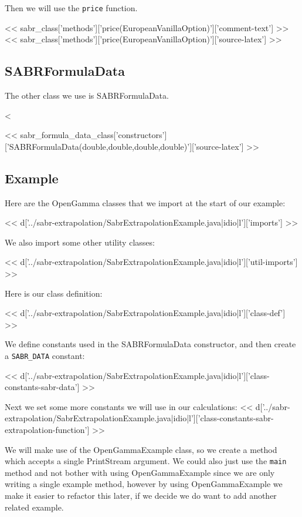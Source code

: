 Then we will use the \verb|price| function.

<< sabr_class['methods']['price(EuropeanVanillaOption)']['comment-text'] >>
<< sabr_class['methods']['price(EuropeanVanillaOption)']['source-latex'] >>

\subsection{SABRFormulaData}

The other class we use is SABRFormulaData.

<%

<< sabr_formula_data_class['constructors']['SABRFormulaData(double,double,double,double)']['source-latex'] >>

\subsection{Example}

Here are the OpenGamma classes that we import at the start of our example:

<< d['../sabr-extrapolation/SabrExtrapolationExample.java|idio|l']['imports'] >>

We also import some other utility classes:

<< d['../sabr-extrapolation/SabrExtrapolationExample.java|idio|l']['util-imports'] >>

Here is our class definition:

<< d['../sabr-extrapolation/SabrExtrapolationExample.java|idio|l']['class-def'] >>

We define constants used in the SABRFormulaData constructor, and then create a
\verb|SABR_DATA| constant:

<< d['../sabr-extrapolation/SabrExtrapolationExample.java|idio|l']['class-constants-sabr-data'] >>

Next we set some more constants we will use in our calculations:
<< d['../sabr-extrapolation/SabrExtrapolationExample.java|idio|l']['class-constants-sabr-extrapolation-function'] >>

We will make use of the OpenGammaExample class, so we create a method which
accepts a single PrintStream argument. We could also just use the \verb|main|
method and not bother with using OpenGammaExample since we are only writing a
single example method, however by using OpenGammaExample we make it easier to
refactor this later, if we decide we do want to add another related example.

